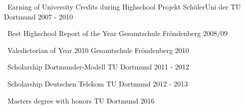 
\begin{cvhonors}
    \cvhonor
        {~Earning of University Credits during Highschool} %
        {Projekt SchülerUni der TU Dortmund} %
        {} %
        {2007 - 2010} %

    \cvhonor
        {~Best Highschool Report of the Year} %
        {Gesamtschule Fröndenberg} %
        {} %
        {2008/09} %

    \cvhonor
        {~Valedictorian of Year 2010} %
        {Gesamtschule Fröndenberg} %
        {} %
        {2010} %

    \cvhonor
        {~Scholarship Dortmunder-Modell} %
        {TU Dortmund} %
        {} %
        {2011 - 2012} %

    \cvhonor
        {~Scholarship Deutschen Telekom} %
        {TU Dortmund} %
        {} %
        {2012 - 2013} %

    \cvhonor
        {~Masters degree with honors} %
        {TU Dortmund} %
        {} %
        {2016} %

\end{cvhonors}
